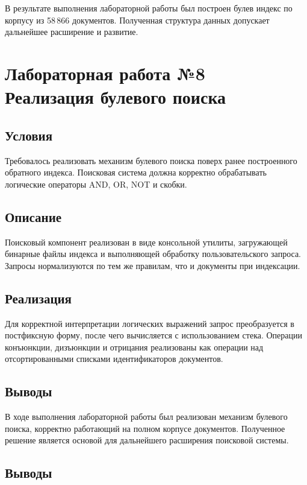 \documentclass[12pt,a4paper]{article}
\begin{document}
В результате выполнения лабораторной работы был построен булев индекс по корпусу из 58\,866 документов. Полученная структура данных допускает дальнейшее расширение и развитие.

\newpage
\section*{Лабораторная работа №8\\
Реализация булевого поиска}

\subsection*{Условия}

Требовалось реализовать механизм булевого поиска поверх ранее построенного обратного индекса. Поисковая система должна корректно обрабатывать логические операторы AND, OR, NOT и скобки.

\subsection*{Описание}

Поисковый компонент реализован в виде консольной утилиты, загружающей бинарные файлы индекса и выполняющей обработку пользовательского запроса. Запросы нормализуются по тем же правилам, что и документы при индексации.

\subsection*{Реализация}

Для корректной интерпретации логических выражений запрос преобразуется в постфиксную форму, после чего вычисляется с использованием стека. Операции конъюнкции, дизъюнкции и отрицания реализованы как операции над отсортированными списками идентификаторов документов.

\subsection*{Выводы}

В ходе выполнения лабораторной работы был реализован механизм булевого поиска, корректно работающий на полном корпусе документов. Полученное решение является основой для дальнейшего расширения поисковой системы.

\newpage

\subsection*{Выводы}
\end{document}
